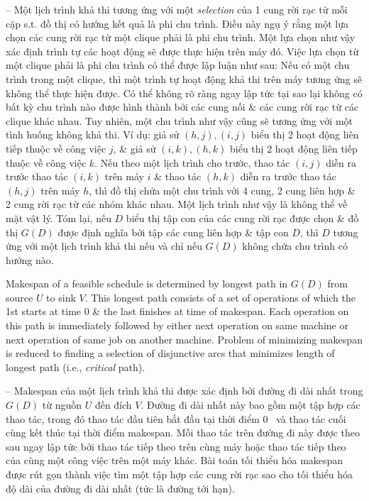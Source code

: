 \documentclass{article}
\begin{document}
\begin{itemize}
\begin{itemize}
        -- Một lịch trình khả thi tương ứng với một {\it selection} của 1 cung rời rạc từ mỗi cặp s.t. đồ thị có hướng kết quả là phi chu trình. Điều này ngụ ý rằng một lựa chọn các cung rời rạc từ một clique phải là phi chu trình. Một lựa chọn như vậy xác định trình tự các hoạt động sẽ được thực hiện trên máy đó. Việc lựa chọn từ một clique phải là phi chu trình có thể được lập luận như sau: Nếu có một chu trình trong một clique, thì một trình tự hoạt động khả thi trên máy tương ứng sẽ không thể thực hiện được. Có thể không rõ ràng ngay lập tức tại sao lại không có bất kỳ chu trình nào được hình thành bởi các cung nối \& các cung rời rạc từ các clique khác nhau. Tuy nhiên, một chu trình như vậy cũng sẽ tương ứng với một tình huống không khả thi. Ví dụ: giả sử $(h,j),(i,j)$ biểu thị 2 hoạt động liên tiếp thuộc về công việc $j$, \& giả sử $(i,k),(h,k)$ biểu thị 2 hoạt động liên tiếp thuộc về công việc $k$. Nếu theo một lịch trình cho trước, thao tác $(i,j)$ diễn ra trước thao tác $(i,k)$ trên máy $i$ \& thao tác $(h,k)$ diễn ra trước thao tác $(h,j)$ trên máy $h$, thì đồ thị chứa một chu trình với 4 cung, 2 cung liên hợp \& 2 cung rời rạc từ các nhóm khác nhau. Một lịch trình như vậy là không thể về mặt vật lý. Tóm lại, nếu $D$ biểu thị tập con của các cung rời rạc được chọn \& đồ thị $G(D)$ được định nghĩa bởi tập các cung liên hợp \& tập con $D$, thì $D$ tương ứng với một lịch trình khả thi nếu và chỉ nếu $G(D)$ không chứa chu trình có hướng nào.

        Makespan of a feasible schedule is determined by longest path in $G(D)$ from source $U$ to sink $V$. This longest path consists of a set of operations of which the 1st starts at time 0 \& the last finishes at time of makespan. Each operation on this path is immediately followed by either next operation on same machine or next operation of same job on another machine. Problem of minimizing makespan is reduced to finding a selection of disjunctive arcs that minimizes length of longest path (i.e., {\it critical} path).

        -- Makespan của một lịch trình khả thi được xác định bởi đường đi dài nhất trong $G(D)$ từ nguồn $U$ đến đích $V$. Đường đi dài nhất này bao gồm một tập hợp các thao tác, trong đó thao tác đầu tiên bắt đầu tại thời điểm 0 \ và thao tác cuối cùng kết thúc tại thời điểm makespan. Mỗi thao tác trên đường đi này được theo sau ngay lập tức bởi thao tác tiếp theo trên cùng máy hoặc thao tác tiếp theo của cùng một công việc trên một máy khác. Bài toán tối thiểu hóa makespan được rút gọn thành việc tìm một tập hợp các cung rời rạc sao cho tối thiểu hóa độ dài của đường đi dài nhất (tức là đường tới hạn).


\end{itemize}
\end{itemize}
\end{document}
